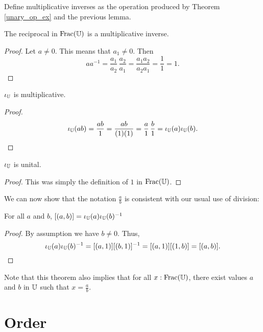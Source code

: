 \documentclass[../../math.tex]{subfiles}
\begin{document}
\begin{definition}
    Define multiplicative inverses as the operation produced by Theorem
    \ref{unary_op_ex} and the previous lemma.
\end{definition}

\begin{instance}
    The reciprocal in $\operatorname{Frac}(\mathbb{U})$ is a multiplicative inverse.
\end{instance}
\begin{proof}
    Let $a \neq 0$.  This means that $a_1 \neq 0$.  Then
    \[
        a a^{-1} = \frac{a_1}{a_2} \, \frac{a_2}{a_1}
        = \frac{a_1a_2}{a_2a_1}
        = \frac{1}{1}
        = 1.
    \]
\end{proof}

\begin{instance}
    $\iota_{\mathbb{U}}$ is multiplicative.
\end{instance}
\begin{proof}
    \[
        \iota_{\mathbb{U}}(ab)
        = \frac{ab}{1}
        = \frac{ab}{(1)(1)}
        = \frac{a}{1} \, \frac{b}{1}
        = \iota_{\mathbb{U}}(a) \iota_{\mathbb{U}}(b).
    \]
\end{proof}

\begin{instance}
    $\iota_{\mathbb{U}}$ is unital.
\end{instance}
\begin{proof}
    This was simply the definition of $1$ in $\operatorname{Frac}(\mathbb{U})$.
\end{proof}

We can now show that the notation $\frac{a}{b}$ is consistent with our usual use
of division:

\begin{theorem}
    For all $a$ and $b$, $[(a, b)] = \iota_{\mathbb{U}}(a) \iota_{\mathbb{U}}(b)^{-1}$
\end{theorem}
\begin{proof}
    By assumption we have $b \neq 0$.  Thus,
    \[
        \iota_{\mathbb{U}}(a) \iota_{\mathbb{U}}(b)^{-1}
        = [(a, 1)] [(b, 1)]^{-1}
        = [(a, 1)] [(1, b)]
        = [(a, b)].
    \]
\end{proof}

Note that this theorem also implies that for all $x : \operatorname{Frac}(\mathbb{U})$, there exist
values $a$ and $b$ in $\mathbb{U}$ such that $x = \frac{a}{b}$.

\section{Order}
\end{document}
